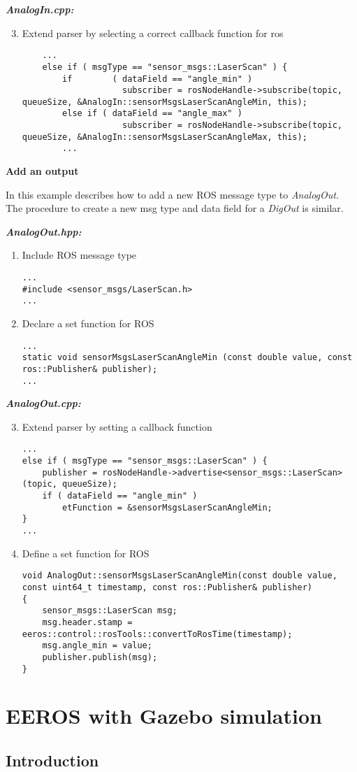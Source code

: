 \textbf{\textit{AnalogIn.cpp:}}
\begin{enumerate}[\hspace{0.5cm}1{.)}]
	\setcounter{enumi}{2}
	\item Extend parser by selecting a correct callback function for ros
	\lstset{language=c}
	\begin{lstlisting}
	...
	else if ( msgType == "sensor_msgs::LaserScan" ) {
		if 		  ( dataField == "angle_min" )
		 			subscriber = rosNodeHandle->subscribe(topic, queueSize, &AnalogIn::sensorMsgsLaserScanAngleMin, this);
		else if ( dataField == "angle_max" )
					subscriber = rosNodeHandle->subscribe(topic, queueSize, &AnalogIn::sensorMsgsLaserScanAngleMax, this);
		...
	\end{lstlisting}
\end{enumerate}


\textbf{Add an output}

In this example describes how to add a new ROS message type to \textit{AnalogOut}.
The procedure to create a new msg type and data field for a \textit{DigOut} is similar.

\textbf{\textit{AnalogOut.hpp:}}
\begin{enumerate}[\hspace{0.5cm}1{.)}]
	\item Include ROS message type
	\lstset{language=c}
	\begin{lstlisting}
...
#include <sensor_msgs/LaserScan.h>
...
	\end{lstlisting}
	
	\item Declare a set function for ROS
	\lstset{language=c}
	\begin{lstlisting}
...
static void sensorMsgsLaserScanAngleMin (const double value, const ros::Publisher& publisher);
...
	\end{lstlisting}
\end{enumerate}

\textbf{\textit{AnalogOut.cpp:}}
\begin{enumerate}[\hspace{0.5cm}1{.)}]
	\setcounter{enumi}{2}
	\item Extend parser by setting a callback function
	\lstset{language=c}
	\begin{lstlisting}
...
else if ( msgType == "sensor_msgs::LaserScan" ) {
	publisher = rosNodeHandle->advertise<sensor_msgs::LaserScan>(topic, queueSize);
	if ( dataField == "angle_min" )
		etFunction = &sensorMsgsLaserScanAngleMin;
}
...
	\end{lstlisting}
	
	\item Define a set function for ROS
	\lstset{language=c}
	\begin{lstlisting}
void AnalogOut::sensorMsgsLaserScanAngleMin(const double value, const uint64_t timestamp, const ros::Publisher& publisher)
{
	sensor_msgs::LaserScan msg;
	msg.header.stamp = eeros::control::rosTools::convertToRosTime(timestamp);
	msg.angle_min = value;
	publisher.publish(msg);
}
	\end{lstlisting}
\end{enumerate}


\section{EEROS with Gazebo simulation}
\label{EerosWithGazebo}
\subsection{Introduction}
